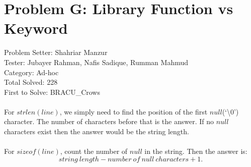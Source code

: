 \section*{Problem G: Library Function vs Keyword}
Problem Setter: Shahriar Manzur \\
Tester: Jubayer Rahman, Nafis Sadique, Rumman Mahmud \\
Category: Ad-hoc \\
Total Solved: 228 \\
First to Solve: BRACU\_Crows \\
\\
For $strlen(line)$, we simply need to find the position of the first $null$(`\textbackslash 0') character.
The number of characters before that is the answer. If no $null$ characters exist then
the answer would be the string length.
\\ \\
For $sizeof(line)$, count the number of $null$ in the string. Then the answer is:
\begin{equation*}
    string\ length - number\ of\ null\ characters + 1.
\end{equation*}


